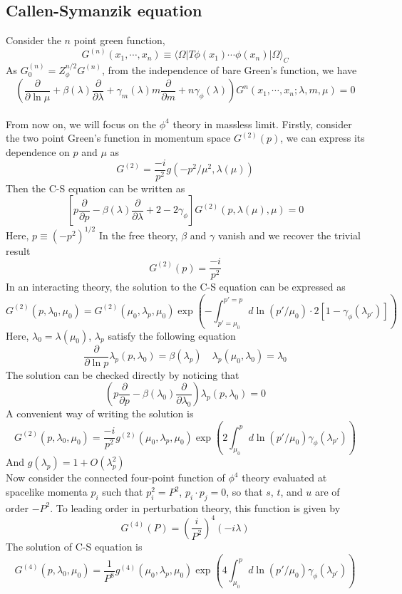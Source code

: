 \documentclass[cyan]{elegantnote}
\begin{document}
\subsection{Callen-Symanzik equation}
Consider the $n$ point green function,
\[G^{(n)}(x_1,\cdots,x_n) \equiv \langle \Omega | T \phi(x_1) \cdots \phi(x_n) | \Omega \rangle_C \]
As $G^{(n)}_0 = Z_{\phi}^{n/2} G^{(n)}$, from the independence of bare Green's function, we have
\[\left( \frac{\partial}{\partial \ln \mu} + \beta(\lambda)  \frac{\partial}{\partial \lambda} + \gamma_m(\lambda) m  \frac{\partial}{\partial m} + n \gamma_{\phi}(\lambda)\right)G^{n}(x_1,\cdots,x_n;\lambda,m,\mu) = 0\]
\\
From now on, we will focus on the $\phi^4$ theory in massless limit. Firstly, consider the two point Green's function in momentum space $G^{(2)}(p)$, we can express its dependence on $p$ and $\mu$ as
\[G^{(2)} = \frac{-i}{p^2} g(-p^2/\mu^2,\lambda(\mu))\]
Then the C-S equation can be written as
\[\left[ p \frac{\partial}{\partial p} - \beta(\lambda)  \frac{\partial}{\partial \lambda} +2 - 2\gamma_{\phi}\right ] G^{(2)}(p,\lambda(\mu),\mu) = 0 \]
Here, $p \equiv (-p^2)^{1/2}$
In the free theory, $\beta$ and $\gamma$ vanish and we recover the trivial result
\[G^{(2)}(p) = \frac{-i}{p^2}\]
In an interacting theory, the solution to the C-S equation can be expressed as
\[G^{(2)}(p,\lambda_0,\mu_0) = G^{(2)}(\mu_0,\lambda_p,\mu_0)\exp \left (-\int_{p'=\mu_0}^{p'=p} d \ln(p'/\mu_0) \cdot 2[1-\gamma_{\phi}(\lambda_{p'})] \right )\]
Here, $\lambda_0 = \lambda(\mu_0)$, $\lambda_p$ satisfy the following equation
\[\frac{\partial}{\partial \ln p} \lambda_p(p,\lambda_0) = \beta(\lambda_p) \quad \lambda_p(\mu_0,\lambda_0) = \lambda_0\]
The solution can be checked directly by noticing that
\[\left ( p \frac{\partial}{\partial p} - \beta(\lambda_0) \frac{\partial}{\partial \lambda_0} \right ) \lambda_p(p,\lambda_0) = 0\]
A convenient way of writing the solution is
\[G^{(2)}(p,\lambda_0,\mu_0) =  \frac{-i}{p^2} g^{(2)}(\mu_0,\lambda_p,\mu_0)\exp \left (2\int_{\mu_0}^{p} d \ln(p'/\mu_0)  \gamma_{\phi}(\lambda_{p'}) \right )\]
And $g(\lambda_p) = 1 + O(\lambda_p^2)$
\\
Now consider the connected four-point function of $\phi^4$ theory evaluated at spacelike momenta $p_i$ such that $p_i^2= P^2$, $p_i \cdot p_j = 0$, so that $s$, $t$, and $u$ are of order $-P^2$. To leading order in perturbation theory, this function is given by
\[G^{(4)}(P) = \left (\frac{i}{P^2}\right )^4 (-i\lambda)\]
The solution of C-S equation is
\[G^{(4)}(p,\lambda_0,\mu_0) =  \frac{1}{P^8} g^{(4)}(\mu_0,\lambda_p,\mu_0)\exp \left (4\int_{\mu_0}^{p} d \ln(p'/\mu_0)  \gamma_{\phi}(\lambda_{p'}) \right )\]
\end{document}
